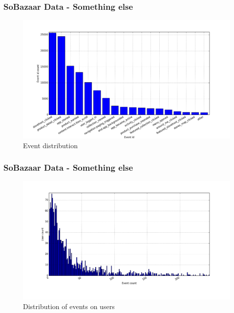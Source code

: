 \documentclass{beamer}
\begin{document}
  \begin{frame}
    \frametitle{SoBazaar Data - Something else}
    \begin{figure}[H]
        \includegraphics[scale=0.3]{../src/image/event_iddistribution.png}
        \centering
        \caption{Event distribution}
    \end{figure}
  \end{frame}

  \begin{frame}
    \frametitle{SoBazaar Data - Something else}
    \begin{figure}[H]
        \includegraphics[scale=0.3]{../src/image/user_iddistribution.png}
        \centering
        \caption{Distribution of events on users}
    \end{figure}
  \end{frame}
\end{document}
